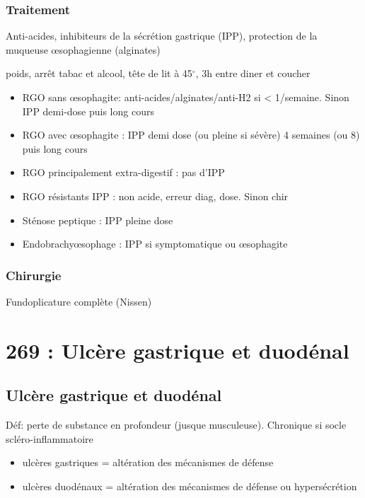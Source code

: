 \documentclass[11pt]{article}
\begin{document}
\subsubsection{Traitement}
\label{sec:org6e7373f}
Anti-acides, inhibiteurs de la sécrétion gastrique (IPP), protection de la muqueuse
\oe{}sophagienne (alginates)

\dec{} poids, arrêt tabac et alcool, tête de lit à 45\(^{\circ}\), 3h entre diner
et coucher

\begin{itemize}
\item RGO sans \oe{}sophagite: anti-acides/alginates/anti-H2 si < 1/semaine. Sinon
IPP demi-dose puis long cours
\item RGO avec \oe{}sophagite : IPP demi dose (ou pleine si sévère) 4 semaines
(ou 8) puis long cours
\item RGO principalement extra-digestif : pas d'IPP
\item RGO résistants IPP : non acide, erreur diag, \inc dose. Sinon chir
\item Sténose peptique : IPP pleine dose
\item Endobrachy\oe{}sophage : IPP si symptomatique ou \oe{}sophagite
\end{itemize}

\subsubsection{Chirurgie}
\label{sec:org34208aa}
Fundoplicature complète (Nissen)

\section{269 : Ulcère gastrique et duodénal}
\label{sec:orgdafa4e6}

\subsection{Ulcère gastrique et duodénal}
\label{sec:org18bdddb}
Déf: perte de substance en profondeur (jusque musculeuse). Chronique si socle
scléro-inflammatoire
\begin{itemize}
\item ulcères gastriques = altération des mécanismes de défense
\item ulcères duodénaux = altération des mécanismes de défense ou hypersécrétion
\end{itemize}
\end{document}
